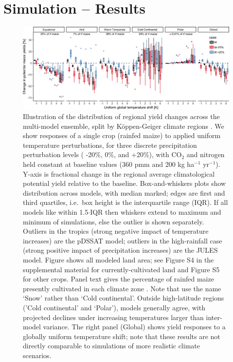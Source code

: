 \documentclass[esd, manuscript]{copernicus} %
\begin{document}
\section{Simulation -- Results}
\label{S:3}
\begin{figure}[ht]
\centering
   \includegraphics[width=14cm]{figures/global_sim_CG.png}
   \caption{Illustration of the distribution of regional yield changes across the multi-model ensemble, split by K\"{o}ppen-Geiger climate regions \citep{rubel2010}. We show responses of a single crop (rainfed maize) to applied uniform temperature perturbations, for three discrete precipitation perturbation levels ( -20\%, 0\%, and +20\%), with CO$_2$ and nitrogen held constant at baseline values (360 pmm and 200 kg ha$^{-1}$ yr$^{-1}$). Y-axis is fractional change in the regional average climatological potential yield relative to the baseline. Box-and-whiskers plots show distribution across models, with median marked; edges are first and third quartiles, i.e.\ box height is the interquartile range (IQR). If all models like within 1.5$\cdot$IQR then whiskers extend to maximum and minimum of simulations, else the outlier is shown separately. Outliers in the tropics (strong negative impact of temperature increases) are the pDSSAT model; outliers in the high-rainfall case (strong positive impact of precipitation increases) are the JULES model. Figure shows all modeled land area; see Figure S4 in the supplemental material for currently-cultivated land and Figure S5 for other crops. Panel text gives the percentage of rainfed maize presently cultivated in each climate zone \citep[data from][]{Portmann2010}. Note that \citet{rubel2010} use the name `Snow' rather than `Cold continental'. Outside high-latitude regions ('Cold continental' and `Polar'), models generally agree, with projected declines under increasing temperatures larger than inter-model variance. The right panel (Global) shows yield responses to a globally uniform temperature shift; note that these results are not directly comparable to simulations of more realistic climate scenarios.}
   \label{fig:globesim}
\end{figure}
\end{document}
